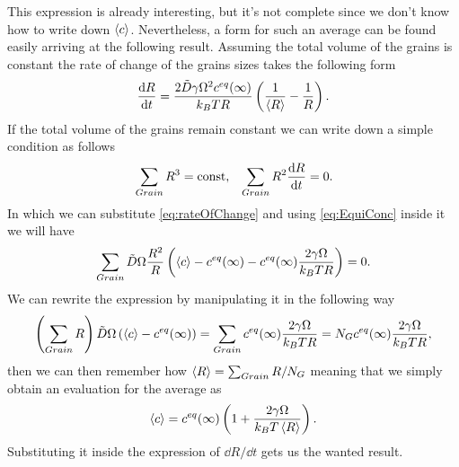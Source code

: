 This expression is already interesting, but it's not complete since we don't know how to write down $\left\langle c \right\rangle$. Nevertheless, a form for such an average can be found easily arriving at the following result.
{
    Assuming the total volume of the grains is constant the rate of change of the grains sizes takes the following form
    \begin{equation}
        \dv{R}{t} =\frac{2\tilde{D}\gamma\Omega^2c^{eq}(\infty)}{k_B TR}\left( \frac{1}{\left\langle R \right\rangle} - \frac{1}{R} \right).
    \end{equation}
}
{
    If the total volume of the grains remain constant we can write down a simple condition as follows
    \begin{align}
        &\sum_{Grain} R^3 = \text{const}, &\sum_{Grain} R^2\dv{R}{t} = 0.
    \end{align}
    In which we can substitute \eqref{eq:rateOfChange} and using \eqref{eq:EquiConc} inside it we will have
    \begin{equation}
        \sum_{Grain}\tilde{D}\Omega\frac{R^2}{R}\left( \left\langle c \right\rangle - c^{eq}(\infty) - c^{eq}(\infty)\frac{2\gamma\Omega}{k_BTR} \right) = 0.
    \end{equation}
    We can rewrite the expression by manipulating it in the following way
    \begin{equation}
        \left( \sum_{Grain}R \right)\tilde{D}\Omega\left( \left\langle c \right\rangle - c^{eq}(\infty) \right) = \sum_{Grain}c^{eq}(\infty)\frac{2\gamma\Omega}{k_BTR} = N_G c^{eq}(\infty)\frac{2\gamma\Omega}{k_BTR},
    \end{equation}
    then we can then remember how $\left\langle R \right\rangle = \sum_{Grain}R / N_G$ meaning that we simply obtain an evaluation for the average as
    \begin{equation}
        \left\langle c \right\rangle = c^{eq}(\infty)\left( 1 + \frac{2\gamma\Omega}{k_BT\left\langle R \right\rangle} \right).
    \end{equation}
    Substituting it inside the expression of $\dd R/\dd t$ gets us the wanted result.
}
